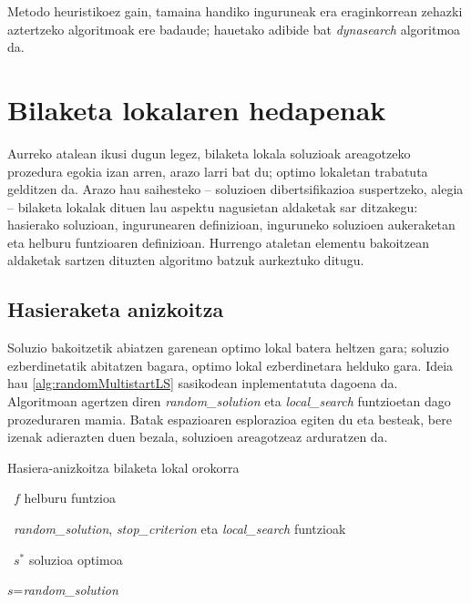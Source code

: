 \documentclass[eu]{ifirak}\usepackage[]{graphicx}\usepackage[]{color}
\begin{document}
Metodo heuristikoez gain, tamaina handiko inguruneak era eraginkorrean zehazki aztertzeko algoritmoak ere badaude; hauetako adibide bat \textit{dynasearch}\citep{congram2000} algoritmoa da.


\section{Bilaketa lokalaren hedapenak}\label{sec:BLHedapenak}

Aurreko atalean ikusi dugun legez, bilaketa lokala soluzioak areagotzeko prozedura egokia izan arren, arazo larri bat du; optimo lokaletan trabatuta gelditzen da. Arazo hau saihesteko -- soluzioen dibertsifikazioa suspertzeko, alegia -- bilaketa lokalak dituen lau aspektu nagusietan aldaketak sar ditzakegu: hasierako soluzioan, ingurunearen definizioan, inguruneko soluzioen aukeraketan eta helburu funtzioaren definizioan. Hurrengo ataletan elementu bakoitzean aldaketak sartzen dituzten algoritmo batzuk aurkeztuko ditugu.


\subsection{Hasieraketa anizkoitza}\label{sec:multistart}
Soluzio bakoitzetik abiatzen garenean optimo lokal batera heltzen gara; soluzio ezberdinetatik abitatzen bagara, optimo lokal ezberdinetara helduko gara. Ideia hau \ref{alg:randomMultistartLS} sasikodean inplementatuta dagoena da. Algoritmoan agertzen diren \textit{random\_solution} eta \textit{local\_search} funtzioetan dago prozeduraren mamia. Batak espazioaren esplorazioa egiten du eta besteak, bere izenak adierazten duen bezala, soluzioen areagotzeaz arduratzen da.


\begin{ifalgorithm}[t]
\begin{ifpseudo}{Hasiera-anizkoitza bilaketa lokal orokorra}
\item \In\ $f$ helburu funtzioa
\item \In\ \textit{random\_solution}, \textit{stop\_criterion} eta \textit{local\_search} funtzioak
\item \Out\ $s^*$ soluzioa optimoa
\item $s$=\textit{random\_solution}
\item {}
\item {}
\item {}
\item {}
\item \Done
\end{ifpseudo}
\caption{Hasieraketa anizkoitza erabiltzen duen bilaketa lokalaren hedapenaren sasikode orokorra}\label{alg:randomMultistartLS}
\end{ifalgorithm}
\end{document}
